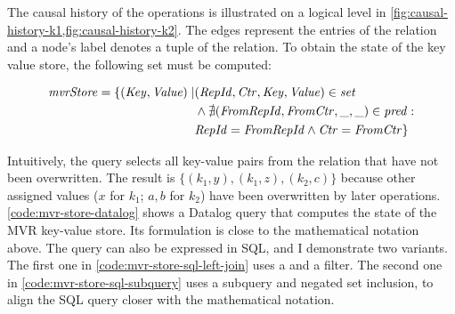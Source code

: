 

The causal history of the operations is illustrated on a logical level
in \ref{fig:causal-history-k1,fig:causal-history-k2}.
The edges represent the entries of the  relation and a node's
 label denotes a tuple of the 
relation.
To obtain the state of the key value store, the following set must be computed:

\begin{align*}
	\mathit{mvrStore} = \{ (\mathit{Key}, \mathit{Value}) \mid
	 & (\mathit{RepId}, \mathit{Ctr}, \mathit{Key}, \mathit{Value}) \in \mathit{set}                      \\
	 & \land \nexists (\mathit{FromRepId}, \mathit{FromCtr}, \mathit{\_}, \mathit{\_}) \in \mathit{pred}: \\
	 & \mathit{RepId} = \mathit{FromRepId} \land \mathit{Ctr} = \mathit{FromCtr} \}
\end{align*}

Intuitively, the query selects all key-value pairs from the  relation
that have not been overwritten.
The result is \(\{ (k_1, y), (k_1, z), (k_2, c)\}\) because other assigned values
(\(x\) for \(k_1\); \(a, b\) for \(k_2\)) have been overwritten by later operations.
\ref{code:mvr-store-datalog} shows a Datalog query that computes the state of the
\ac{MVR} key-value store.
Its formulation is close to the mathematical notation above.
The query can also be expressed in SQL, and I demonstrate two variants.
The first one in \ref{code:mvr-store-sql-left-join} uses a 
and a  filter.
The second one in \ref{code:mvr-store-sql-subquery} uses a subquery
and negated set inclusion, to align the SQL query closer with the mathematical
notation.

